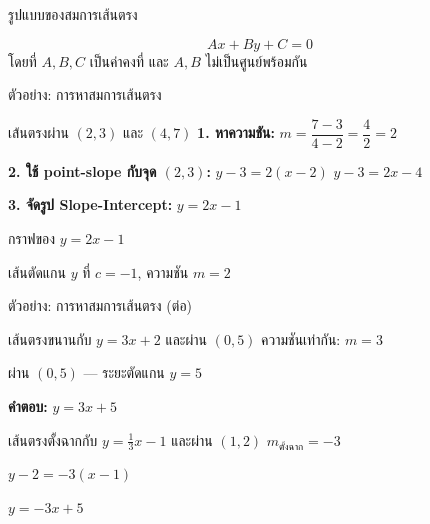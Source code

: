 \documentclass[11pt, aspectratio=169]{beamer}
\begin{document}
\begin{frame}{รูปแบบของสมการเส้นตรง}
  \begin{explanation}
    \[
      Ax + By + C = 0
    \]
    โดยที่ $A, B, C$ เป็นค่าคงที่ และ $A, B$ ไม่เป็นศูนย์พร้อมกัน
  \end{explanation}
\end{frame}

\begin{frame}{ตัวอย่าง: การหาสมการเส้นตรง}
  \begin{exambox}[โจทย์]
    เส้นตรงผ่าน $(2, 3)$ และ $(4, 7)$
    \textbf{1. หาความชัน:}
    $m = \dfrac{7-3}{4-2} = \dfrac{4}{2} = 2$

    \textbf{2. ใช้ point-slope กับจุด $(2, 3)$:}
    $y - 3 = 2(x - 2)$
    $y - 3 = 2x - 4$

    \textbf{3. จัดรูป Slope-Intercept:}
    $y = 2x - 1$
  \end{exambox}
\end{frame}

\begin{frame}{กราฟของ $y = 2x - 1$}
  \centering

  เส้นตัดแกน $y$ ที่ $c = -1$, \; ความชัน $m = 2$
\end{frame}

\begin{frame}{ตัวอย่าง: การหาสมการเส้นตรง (ต่อ)}
  \begin{exambox}[โจทย์]
    เส้นตรงขนานกับ $y = 3x + 2$ และผ่าน $(0, 5)$
    ความชันเท่ากัน: $m = 3$

    ผ่าน $(0,5)$ — ระยะตัดแกน $y = 5$

    \textbf{คำตอบ:} $y = 3x + 5$
  \end{exambox}

  \begin{exambox}[โจทย์]
    เส้นตรงตั้งฉากกับ $y = \frac{1}{3}x - 1$ และผ่าน $(1, 2)$
    $m_{\text{ตั้งฉาก}} = -3$

    $y - 2 = -3(x - 1)$

    $y = -3x + 5$
  \end{exambox}
\end{frame}
\end{document}
